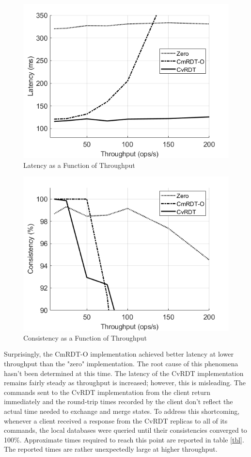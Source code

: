 \documentclass[sigconf,nonacm,10pt]{acmart}
\begin{document}
\begin{figure}[h]
  \centering
  \includegraphics[width=\linewidth]{Fig7Eval1}
  \caption{Latency as a Function of Throughput}
  \label{fig:eval1}
\end{figure}

\begin{figure}[h]
  \centering
  \includegraphics[width=\linewidth]{Fig8Eval2}
  \caption{Consistency as a Function of Throughput}
  \label{fig:eval2}
\end{figure}

Surprisingly, the CmRDT-O implementation achieved better latency at lower throughput than the "zero" implementation. The root cause of this phenomena hasn't been determined at this time. The latency of the CvRDT implementation remains fairly steady as throughput is increased; however, this is misleading. The commands sent to the CvRDT implementation from the client return immediately and the round-trip times recorded by the client don't reflect the actual time needed to exchange and merge states. To address this shortcoming, whenever a client received a response from the CvRDT replicas to all of its commands, the local databases were queried until their consistencies converged to 100\%. Approximate times required to reach this point are reported in table \ref{tbl}. The reported times are rather unexpectedly large at higher throughput.
\end{document}
